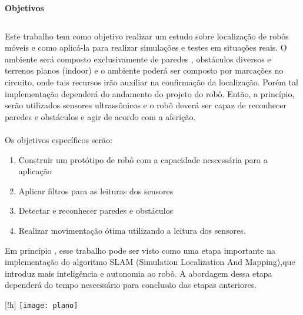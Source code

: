 \documentclass[a0,portrait]{a0poster}
\begin{document}
\begin{multicols}{1}
\color{DarkSlateGray} %
\begin{flushleft}

\textbf{Objetivos}
\end{flushleft}
$$$$
\LARGE

Este trabalho tem como objetivo realizar um estudo sobre localização de robôs móveis e como aplicá-la para realizar simulações e testes em situações reais. O ambiente será composto exclusivamente de paredes , obstáculos diversos e terrenos planos (indoor) e o ambiente poderá ser composto por marcações no circuito, onde tais recursos irão auxiliar na confirmação da localização. Porém tal implementação dependerá do andamento do projeto do robô. Então, a princípio, serão utilizados sensores ultrassônicos e o robô deverá ser capaz de reconhecer paredes e obstáculos e agir de acordo com a aferição.\\\\Os objetivos específicos serão:\\
\begin{enumerate}
\item Construir um protótipo de robô com a capacidade nescessária para a aplicação
\item Aplicar filtros para as leituras dos sensores
\item Detectar e reconhecer paredes e obstáculos
\item Realizar movimentação ótima utilizando a leitura dos sensores. 
\end{enumerate}
\LARGE
\par Em princípio , esse trabalho pode ser visto como uma etapa importante na implementação do algoritmo SLAM (Simulation Localization And Mapping),que introduz mais inteligência e autonomia ao robô. A abordagem dessa etapa dependerá do tempo nescessário para conclusão das etapas anteriores.

\begin{center}[!h]\vspace{1cm}
\texttt{[image: plano]}
\end{center}\vspace{1cm}


\end{multicols}
\end{document}
